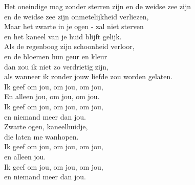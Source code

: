 \clearpage
\begin{translation}
Het oneindige mag zonder sterren zijn en de weidse zee zijn\\
en de weidse zee zijn onmetelijkheid verliezen,\\
Maar het zwarte in je ogen - zal niet sterven\\
en het kaneel van je huid blijft gelijk.\\
\vspace*{1\baselineskip}
Als de regenboog zijn schoonheid verloor,\\
en de bloemen hun geur en kleur\\
dan zou ik niet zo verdrietig zijn,\\
als wanneer ik zonder jouw liefde zou worden gelaten.\\
Ik geef om jou, om jou, om jou,\\
En alleen jou, om jou, om jou.\\
Ik geef om jou, om jou, om jou,\\
en niemand meer dan jou.\\
\vspace*{1\baselineskip}
Zwarte ogen, kaneelhuidje,\\
die laten me wanhopen.\\
Ik geef om jou, om jou, om jou,\\
en alleen jou.\\
Ik geef om jou, om jou, om jou,\\
en niemand meer dan jou. 
\end{translation}
